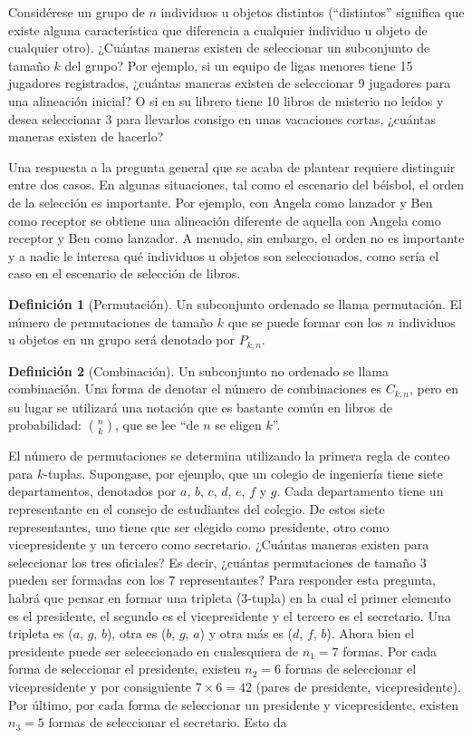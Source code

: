 \documentclass[
  11pt,
]{book}
\theoremstyle{definition}
\newtheorem{definition}{Definición}[chapter]
\theoremstyle{definition}
\theoremstyle{definition}
\theoremstyle{definition}
\theoremstyle{remark}
\begin{document}
Considérese un grupo de \(n\) individuos u objetos distintos (``distintos'' significa que existe alguna característica que diferencia a cualquier individuo u objeto de cualquier otro). ¿Cuántas maneras existen de seleccionar un subconjunto de tamaño \(k\) del grupo? Por ejemplo, si un equipo de ligas menores tiene 15 jugadores registrados, ¿cuántas maneras existen de seleccionar 9 jugadores para una alineación inicial? O si en su librero tiene 10 libros de misterio no leídos y desea seleccionar 3 para llevarlos consigo en unas vacaciones cortas, ¿cuántas maneras existen de hacerlo? \citep[página 62]{Devore}

Una respuesta a la pregunta general que se acaba de plantear requiere distinguir entre dos casos. En algunas situaciones, tal como el escenario del béisbol, el orden de la selección es importante. Por ejemplo, con Angela como lanzador y Ben como receptor se obtiene una alineación diferente de aquella con Angela como receptor y Ben como lanzador. A menudo, sin embargo, el orden no es importante y a nadie le interesa qué individuos u objetos son seleccionados, como sería el caso en el escenario de selección de libros.

\begin{definition}[Permutación]
Un subconjunto ordenado se llama permutación. El número de permutaciones de tamaño \(k\) que se puede formar con los \(n\) individuos u objetos en un grupo será denotado por \(P_{k,n}\).
\end{definition}

\begin{definition}[Combinación]
Un subconjunto no ordenado se llama combinación. Una forma de denotar el número de combinaciones es \(C_{k,n}\), pero en su lugar se utilizará una notación que es bastante común en libros de probabilidad: \(\binom{n}{k}\), que se lee ``de \(n\) se eligen \(k\)''.
\end{definition}

El número de permutaciones se determina utilizando la primera regla de conteo para \(k\)-tuplas. Supongase, por ejemplo, que un colegio de ingeniería tiene siete departamentos, denotados por \(a\), \(b\), \(c\), \(d\), \(e\), \(f\) y \(g\). Cada departamento tiene un representante en el consejo de estudiantes del colegio. De estos siete representantes, uno tiene que ser elegido como presidente, otro como vicepresidente y un tercero como secretario. ¿Cuántas maneras existen para seleccionar los tres oficiales? Es decir, ¿cuántas permutaciones de tamaño 3 pueden ser formadas con los 7 representantes? Para responder esta pregunta, habrá que pensar en formar una tripleta (3-tupla) en la cual el primer elemento es el presidente, el segundo es el vicepresidente y el tercero es el secretario. Una tripleta es (\(a\), \(g\), \(b\)), otra es (\(b\), \(g\), \(a\)) y otra más es (\(d\), \(f\), \(b\)). Ahora bien el presidente puede ser seleccionado en cualesquiera de \(n_1 = 7\) formas. Por cada forma de seleccionar el presidente, existen \(n_2 = 6\) formas de seleccionar el vicepresidente y por consiguiente \(7 \times 6 = 42\) (pares de presidente, vicepresidente). Por último, por cada forma de seleccionar un presidente y vicepresidente, existen \(n_3 = 5\) formas de seleccionar el secretario. Esto da
\end{document}

